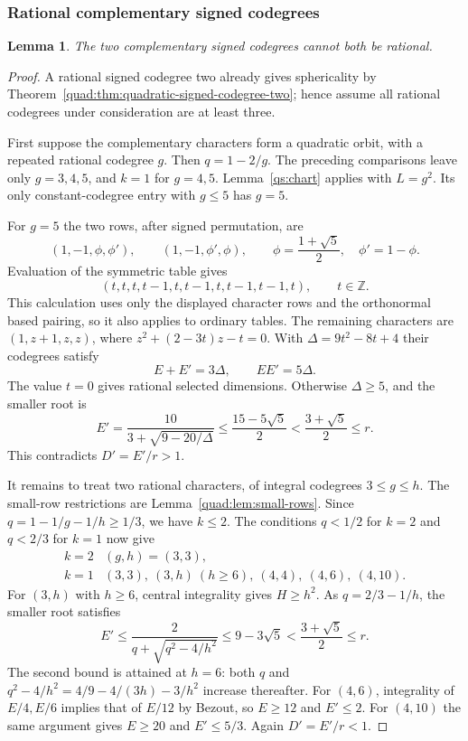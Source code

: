 \documentclass[11pt,a4paper]{article}
\newtheorem{lemma}[theorem]{Lemma}
\theoremstyle{definition}\newtheorem{definition}[theorem]{Definition}
\theoremstyle{remark}\newtheorem{remark}[theorem]{Remark}
\newcommand{\ZZ}{\mathbb Z}
\numberwithin{equation}{section}
\begin{document}
\subsubsection{Rational complementary signed codegrees}

\begin{lemma}\label{qs:rational-complement}
The two complementary signed codegrees cannot both be rational.
\end{lemma}
\begin{proof}
A rational signed codegree two already gives sphericality by
Theorem~\ref{quad:thm:quadratic-signed-codegree-two}; hence assume all
rational codegrees under consideration are at least three.

First suppose the complementary characters form a quadratic orbit,
with a repeated rational codegree $g$. Then $q=1-2/g$.
The preceding comparisons leave only $g=3,4,5$, and $k=1$ for
$g=4,5$. Lemma~\ref{qs:chart} applies with $L=g^2$. Its only constant-codegree
entry with $g\le5$ has $g=5$.

For $g=5$ the two rows, after signed permutation, are
\[
 (1,-1,\phi,\phi'),\qquad(1,-1,\phi',\phi),
 \qquad \phi=\frac{1+\sqrt5}{2},\quad\phi'=1-\phi.
\]
Evaluation of the symmetric table gives
\begin{equation}\label{quad:eq:constant-five-normal-form}
(t,t,t,t-1,t,t-1,t,t-1,t-1,t),\qquad t\in\ZZ.
\end{equation}
This calculation uses only the displayed character rows and the
orthonormal based pairing, so it also applies to ordinary tables.
The remaining characters are $(1,z+1,z,z)$, where
$z^2+(2-3t)z-t=0$. With $\Delta=9t^2-8t+4$ their codegrees satisfy
\[
 E+E'=3\Delta,\qquad EE'=5\Delta.
\]
The value $t=0$ gives rational selected dimensions. Otherwise
$\Delta\ge5$, and the smaller root is
\[
 E'=\frac{10}{3+\sqrt{9-20/\Delta}}
 \le\frac{15-5\sqrt5}{2}<\frac{3+\sqrt5}{2}\le r.
\]
This contradicts $D'=E'/r>1$.

It remains to treat two rational characters, of integral codegrees
$3\le g\le h$. The small-row restrictions are
Lemma~\ref{quad:lem:small-rows}. Since $q=1-1/g-1/h\ge1/3$, we have $k\le2$.
The conditions $q<1/2$ for $k=2$ and $q<2/3$ for $k=1$ now give
\[
\begin{array}{c|l}
k=2&(g,h)=(3,3),\\
k=1&(3,3),\ (3,h)\ (h\ge6),\ (4,4),\ (4,6),\ (4,10).
\end{array}
\]
For $(3,h)$ with $h\ge6$, central integrality gives $H\ge h^2$.
As $q=2/3-1/h$, the smaller root satisfies
\[
 E'\le\frac2{q+\sqrt{q^2-4/h^2}}
 \le9-3\sqrt5<\frac{3+\sqrt5}{2}\le r.
\]
The second bound is attained at $h=6$: both $q$ and
$q^2-4/h^2=4/9-4/(3h)-3/h^2$ increase thereafter.
For $(4,6)$, integrality of $E/4,E/6$ implies that of $E/12$ by
Bezout, so $E\ge12$ and $E'\le2$. For $(4,10)$ the same argument
gives $E\ge20$ and $E'\le5/3$. Again $D'=E'/r<1$.


\end{proof}
\end{document}
